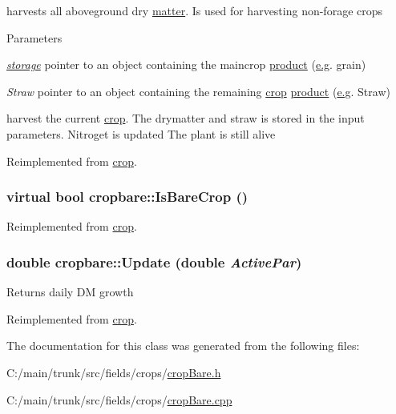 harvests all aboveground dry \hyperlink{classmatter}{matter}. Is used for harvesting non-\/forage crops 
\begin{DoxyParams}{Parameters}
\item[{\em \hyperlink{classstorage}{storage}}]pointer to an object containing the maincrop \hyperlink{classproduct}{product} (\hyperlink{typer_8h_ae4c405e5c68c6ec2c44bb6d6adfc2f6ca35c0bb7088830963c73dcf0470ab8922}{e.g}. grain) \item[{\em Straw}]pointer to an object containing the remaining \hyperlink{classcrop}{crop} \hyperlink{classproduct}{product} (\hyperlink{typer_8h_ae4c405e5c68c6ec2c44bb6d6adfc2f6ca35c0bb7088830963c73dcf0470ab8922}{e.g}. Straw)\end{DoxyParams}
harvest the current \hyperlink{classcrop}{crop}. The drymatter and straw is stored in the input parameters. Nitroget is updated The plant is still alive 

Reimplemented from \hyperlink{classcrop_a387dc393ee7cd05a40874739cff8579e}{crop}.\hypertarget{classcropbare_a9fa5ef7d9c5e0ca6d8cc6fe35b00ab86}{
\subsubsection[{IsBareCrop}]{\setlength{\rightskip}{0pt plus 5cm}virtual bool cropbare::IsBareCrop ()}}
\label{classcropbare_a9fa5ef7d9c5e0ca6d8cc6fe35b00ab86}


Reimplemented from \hyperlink{classcrop_a8dd9a3a833e045f767eb3a6abd5f9677}{crop}.\hypertarget{classcropbare_a141cff2a17ccfb22637dd0692a427795}{
\subsubsection[{Update}]{\setlength{\rightskip}{0pt plus 5cm}double cropbare::Update (double {\em ActivePar})}}
\label{classcropbare_a141cff2a17ccfb22637dd0692a427795}
Returns daily DM growth 

Reimplemented from \hyperlink{classcrop_a9ed02462e332fffb65498075e7499bf4}{crop}.

The documentation for this class was generated from the following files:\begin{DoxyCompactItemize}
\item 
C:/main/trunk/src/fields/crops/\hyperlink{crop_bare_8h}{cropBare.h}\item 
C:/main/trunk/src/fields/crops/\hyperlink{crop_bare_8cpp}{cropBare.cpp}\end{DoxyCompactItemize}
